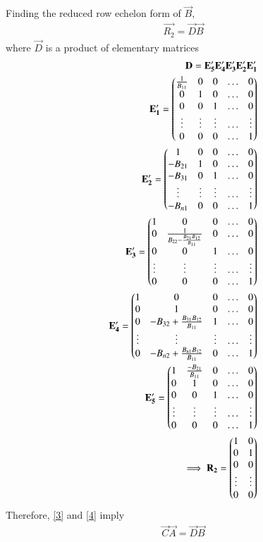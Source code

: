 \documentclass[journal,12pt,twocolumn]{IEEEtran}
\begin{document}
Finding the reduced row echelon form of $\vec{B}$,
\begin{align}
    \vec{R_2}=\vec{D}\vec{B}\label{4}
\end{align}
where $\vec{D}$ is a product of elementary matrices
\begin{align}
    \mathbf{D}=\mathbf{E'_5}\mathbf{E'_4}\mathbf{E'_3}\mathbf{E'_2}\mathbf{E'_1}\\
    \mathbf{E'_1}=\begin{pmatrix}\frac{1}{B_{11}}&0&0&\hdots&0\\0&1&0&\hdots&0\\0&0&1&\hdots&0\\\vdots&\vdots&\vdots&\hdots&\vdots\\0&0&0&\hdots&1\end{pmatrix}\\
   \mathbf{E'_2}=\begin{pmatrix}1&0&0&\hdots&0\\-B_{21}&1&0&\hdots&0\\-B_{31}&0&1&\hdots&0\\\vdots&\vdots&\vdots&\hdots&\vdots\\-B_{n1}&0&0&\hdots&1\end{pmatrix}\\
   \mathbf{E'_3}=\begin{pmatrix}1&0&0&\hdots&0\\0&\frac{1}{B_{22}-\frac{B_{21}B_{12}}{B_{11}}}&0&\hdots&0\\0&0&1&\hdots&0\\\vdots&\vdots&\vdots&\hdots&\vdots\\0&0&0&\hdots&1\end{pmatrix}\\
   \mathbf{E'_4}=\begin{pmatrix}1&0&0&\hdots&0\\0&1&0&\hdots&0\\0&-B_{32}+\frac{B_{31}B_{12}}{B_{11}}&1&\hdots&0\\\vdots&\vdots&\vdots&\hdots&\vdots\\0&-B_{n2}+\frac{B_{n1}B_{12}}{B_{11}}&0&\hdots&1\end{pmatrix}\\
   \mathbf{E'_5}=\begin{pmatrix}1&\frac{-B_{21}}{B_{11}}&0&\hdots&0\\0&1&0&\hdots&0\\0&0&1&\hdots&0\\\vdots&\vdots&\vdots&\hdots&\vdots\\0&0&0&\hdots&1\end{pmatrix}\\
    \implies \mathbf{R_2}=\begin{pmatrix}1&0\\0&1\\0&0\\\vdots&\vdots\\0&0\end{pmatrix}
\end{align}
Therefore, \eqref{3} and \eqref{4} imply
\begin{align}
   \vec{C}\vec{A}=\vec{D}\vec{B}
\end{align}
\end{document}
